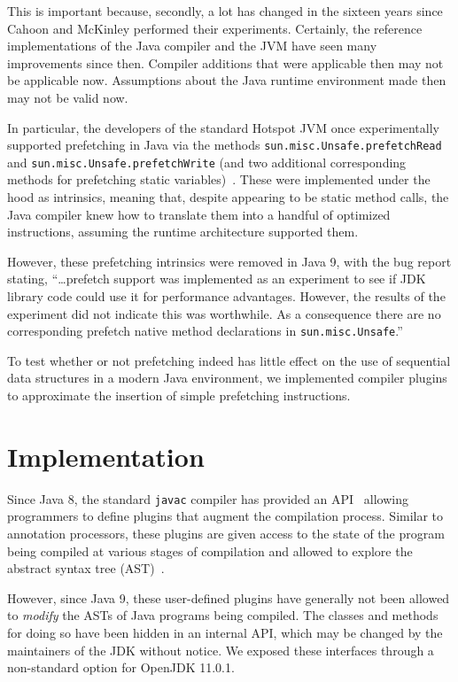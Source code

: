 \documentclass[journal]{IEEEtran}
\begin{document}
This is important because, secondly, a lot has changed in the sixteen years since Cahoon and McKinley performed their experiments. Certainly, the reference implementations of the Java compiler and the JVM have seen many improvements since then. Compiler additions that were applicable then may not be applicable now. Assumptions about the Java runtime environment made then may not be valid now.

In particular, the developers of the standard Hotspot JVM once experimentally supported prefetching in Java via the methods \texttt{sun.misc.Unsafe.prefetchRead} and \texttt{sun.misc.Unsafe.prefetchWrite} (and two additional corresponding methods for prefetching static variables)~\cite{oracle}. These were implemented under the hood as intrinsics, meaning that, despite appearing to be static method calls, the Java compiler knew how to translate them into a handful of optimized instructions, assuming the runtime architecture supported them.

However, these prefetching intrinsics were removed in Java 9, with the bug report stating, ``\dots prefetch support was implemented as an experiment to see if JDK library code could use it for performance advantages. However, the results of the experiment did not indicate this was worthwhile. As a consequence there are no corresponding prefetch native method declarations in \texttt{sun.misc.Unsafe}.''~\cite{oracle}

To test whether or not prefetching indeed has little effect on the use of sequential data structures in a modern Java environment, we implemented compiler plugins to approximate the insertion of simple prefetching instructions.


\section{Implementation}

Since Java 8, the standard \texttt{javac} compiler has provided an API~\cite{javacPlugins} allowing programmers to define plugins that augment the compilation process. Similar to annotation processors, these plugins are given access to the state of the program being compiled at various stages of compilation and allowed to explore the abstract syntax tree (AST)~\cite{javacAST}.

However, since Java 9, these user-defined plugins have generally not been allowed to \textit{modify} the ASTs of Java programs being compiled. The classes and methods for doing so have been hidden in an internal API, which may be changed by the maintainers of the JDK without notice. We exposed these interfaces through a non-standard option for OpenJDK 11.0.1.
\end{document}
